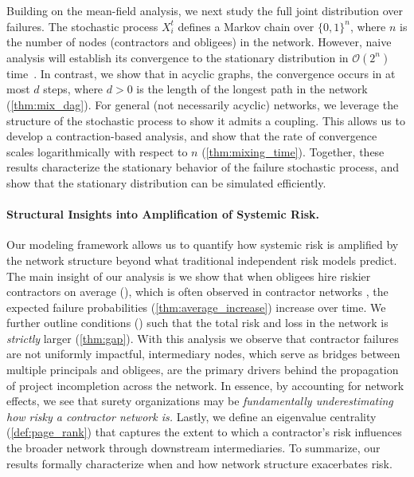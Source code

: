 \documentclass[mnsc,nonblindrev]{informs3}
\newcommand{\bigO}{\mathcal{O}}
\begin{document}
Building on the mean-field analysis, we next study the full joint distribution over failures.  The stochastic process $X_i^t$ defines a Markov chain over $\{0,1\}^n$, where $n$ is the number of nodes (contractors and obligees) in the network.  However, naive analysis will establish its convergence to the stationary distribution in $\bigO(2^n)$ time~\citep{resnick2013adventures}.  In contrast, we show that in acyclic graphs, the convergence occurs in at most $d$ steps, where $d > 0$ is the length of the longest path in the network (\cref{thm:mix_dag}). For general (not necessarily acyclic) networks, we leverage the structure of the stochastic process to show it admits a coupling. This allows us to develop a contraction-based analysis, and show that the rate of convergence scales logarithmically with respect to $n$ (\cref{thm:mixing_time}).
%
Together, these results characterize the stationary behavior of the failure stochastic process, and show that the stationary distribution can be simulated efficiently.



\paragraph{Structural Insights into Amplification of Systemic Risk.}  
Our modeling framework allows us to quantify how systemic risk is amplified by the network structure beyond what traditional independent risk models predict.  The main insight of our analysis is we show that when obligees hire riskier contractors on average (), which is often observed in contractor networks \citep{dietz2018mitigating}, the expected failure probabilities (\cref{thm:average_increase}) increase over time.  
 We further outline conditions () such that the total risk and loss in the network is {\em strictly} larger (\cref{thm:gap}).  With this analysis we observe that contractor failures are not uniformly impactful, intermediary nodes, which serve as bridges between multiple principals and obligees, are the primary drivers behind the propagation of project incompletion across the network. In essence, by accounting for network effects, we see that surety organizations may be {\em fundamentally underestimating how risky a contractor network is.}  
Lastly, we define an eigenvalue centrality (\cref{def:page_rank}) that captures the extent to which a contractor’s risk influences the broader network through downstream intermediaries.
To summarize, our results formally characterize when and how network structure exacerbates risk.
\end{document}
